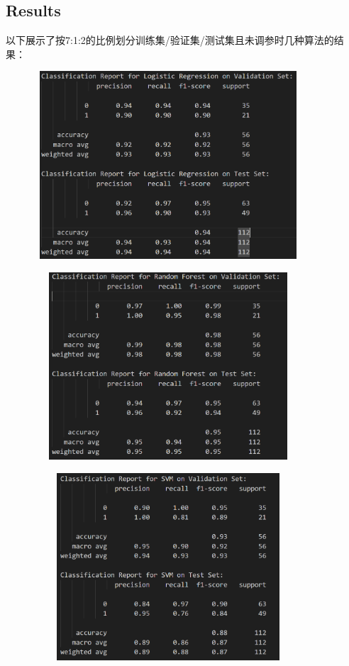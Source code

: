 \documentclass{ctexart}
\begin{document}
\subsection{Results}
以下展示了按7:1:2的比例划分训练集/验证集/测试集且未调参时几种算法的结果：
\begin{figure}[H]
	\centering 
	\includegraphics[height=7cm,width=10cm]{1.png}
	\end{figure}
	\begin{figure}[H]
		\centering 
		\includegraphics[height=7cm,width=10cm]{2.png}
		\end{figure}
		\begin{figure}[H]
			\centering 
			\includegraphics[height=7cm,width=10cm]{3.png}
			\end{figure}
\end{document}

